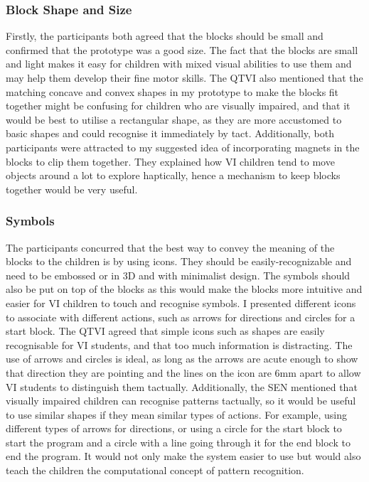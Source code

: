 \documentclass[oneside,%
                    author={Malak Hajji},
                    degree={BSc},
                    title={Designing An Accessible Computational Toolkit For Students},
                  subtitle={With Mixed Visual Abilities}]{dissertation}
\begin{document}
\subsubsection{Block Shape and Size}
Firstly, the participants both agreed that the blocks should be small and confirmed that the prototype was a good size. The fact that the blocks are small and light makes it easy for  children with mixed visual abilities to use them and may help them develop their fine motor skills. The QTVI also mentioned that the  matching concave and convex shapes in my prototype to make the blocks fit together might be confusing for children who are visually impaired, and that it would be best to utilise a rectangular shape, as they are more accustomed to basic shapes and could recognise it immediately by tact. Additionally, both participants were attracted to my suggested idea of incorporating magnets in the blocks to clip them together. They explained how VI children tend to move objects around a lot to explore haptically, hence a mechanism to keep blocks together would be very useful.

\subsubsection{Symbols}
The participants concurred that the best way to convey the meaning of the blocks to the children is by using icons. They should be easily-recognizable and need to be embossed or in 3D and with minimalist design. The symbols should also be put on top of the blocks as this would make the blocks more intuitive and easier for VI children to touch and recognise symbols.
I presented different icons to associate with different actions, such as arrows for directions and circles for a start block. The QTVI agreed that simple icons such as shapes are easily recognisable for VI students, and that too much information is distracting. The use of arrows and circles is ideal, as long as the arrows are acute enough to show that direction they are pointing and the lines on the icon are 6mm apart to allow VI students to distinguish them tactually. Additionally, the SEN mentioned that visually impaired children can recognise patterns tactually, so it would be useful to use similar shapes if they mean similar types of actions. For example, using different types of arrows for directions, or using a circle for the start block to start the program and a circle with a line going through it for the end block to end the program. It would not only make the system easier to use but would also teach the children the computational concept of pattern recognition.
\end{document}
